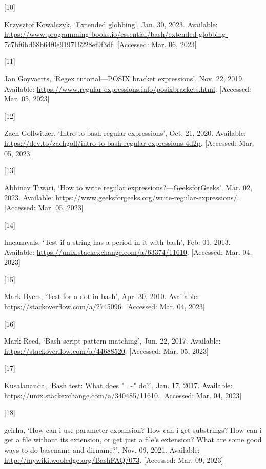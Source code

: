 \documentclass[
  a4paper,
]{article}
\newlength{\cslhangindent}
\newlength{\csllabelwidth}
\newlength{\cslentryspacingunit} %
\newenvironment{CSLReferences}[2] %
 {%
  \setlength{\parindent}{0pt}
  \ifodd #1
  \let\oldpar\par
  \def\par{\hangindent=\cslhangindent\oldpar}
  \fi
  \setlength{\parskip}{#2\cslentryspacingunit}
 }%
 {}
\newcommand{\CSLLeftMargin}[1]{\parbox[t]{\csllabelwidth}{#1}}
\newcommand{\CSLRightInline}[1]{\parbox[t]{\linewidth - \csllabelwidth}{#1}\break}
\begin{document}
\begin{CSLReferences}{0}{0}
\leavevmode{}%
\CSLLeftMargin{{[}10{]} }%
\CSLRightInline{Krzysztof Kowalczyk, {`Extended globbing'}, Jan. 30,
2023. Available:
\url{https://www.programming-books.io/essential/bash/extended-globbing-7c7bf6bd68b64f0e919716228ef9f3df}.
{[}Accessed: Mar. 06, 2023{]}}

\leavevmode{}%
\CSLLeftMargin{{[}11{]} }%
\CSLRightInline{Jan Goyvaerts, {`Regex tutorial---POSIX bracket
expressions'}, Nov. 22, 2019. Available:
\url{https://www.regular-expressions.info/posixbrackets.html}.
{[}Accessed: Mar. 05, 2023{]}}

\leavevmode{}%
\CSLLeftMargin{{[}12{]} }%
\CSLRightInline{Zach Gollwitzer, {`Intro to bash regular expressions'},
Oct. 21, 2020. Available:
\url{https://dev.to/zachgoll/intro-to-bash-regular-expressions-4d2p}.
{[}Accessed: Mar. 05, 2023{]}}

\leavevmode{}%
\CSLLeftMargin{{[}13{]} }%
\CSLRightInline{Abhinav Tiwari, {`How to write regular
expressions?---GeeksforGeeks'}, Mar. 02, 2023. Available:
\url{https://www.geeksforgeeks.org/write-regular-expressions/}.
{[}Accessed: Mar. 05, 2023{]}}

\leavevmode{}%
\CSLLeftMargin{{[}14{]} }%
\CSLRightInline{lmcanavals, {`Test if a string has a period in it with
bash'}, Feb. 01, 2013. Available:
\url{https://unix.stackexchange.com/a/63374/11610}. {[}Accessed: Mar.
04, 2023{]}}

\leavevmode{}%
\CSLLeftMargin{{[}15{]} }%
\CSLRightInline{Mark Byers, {`Test for a dot in bash'}, Apr. 30, 2010.
Available: \url{https://stackoverflow.com/a/2745096}. {[}Accessed: Mar.
04, 2023{]}}

\leavevmode{}%
\CSLLeftMargin{{[}16{]} }%
\CSLRightInline{Mark Reed, {`Bash script pattern matching'}, Jun. 22,
2017. Available: \url{https://stackoverflow.com/a/44688520}.
{[}Accessed: Mar. 05, 2023{]}}

\leavevmode{}%
\CSLLeftMargin{{[}17{]} }%
\CSLRightInline{Kusalananda, {`Bash test: What does "=\textasciitilde"
do?'}, Jan. 17, 2017. Available:
\url{https://unix.stackexchange.com/a/340485/11610}. {[}Accessed: Mar.
04, 2023{]}}

\leavevmode{}%
\CSLLeftMargin{{[}18{]} }%
\CSLRightInline{geirha, {`How can i use parameter expansion? How can i
get substrings? How can i get a file without its extension, or get just
a file's extension? What are some good ways to do basename and
dirname?'}, Nov. 09, 2021. Available:
\url{http://mywiki.wooledge.org/BashFAQ/073}. {[}Accessed: Mar. 09,
2023{]}}


\end{CSLReferences}
\end{document}
